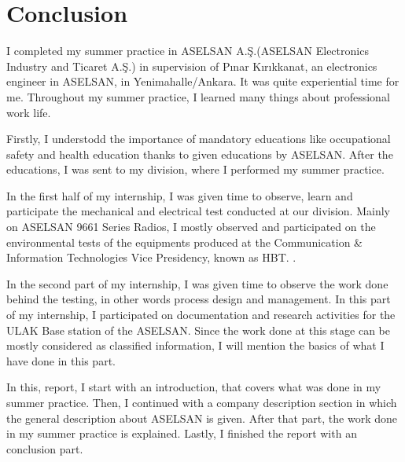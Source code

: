 	











\section{Conclusion}

\-
\indent I completed my summer practice in ASELSAN A.Ş.(ASELSAN Electronics Industry and Ticaret A.Ş.) in supervision of Pınar Kırıkkanat, an electronics engineer in ASELSAN, in Yenimahalle/Ankara. It was quite experiential time for me. Throughout my summer practice, I learned many things about professional work life. 

	Firstly, I understodd the importance of mandatory educations like occupational safety and health education thanks to given educations by ASELSAN. After the educations, I was  sent to my division, where I performed my summer practice.
	
	In the first half of my internship, I was given time to observe, learn and participate the mechanical and electrical test conducted at our division. Mainly on ASELSAN 9661 Series Radios, I mostly observed and participated on the environmental tests of the equipments produced at the Communication \& Information Technologies Vice Presidency, known as HBT. .
	
	In the second part of my internship, I was given time to observe the work done behind the testing, in other words process design and management. In this part of my internship, I participated on documentation and research activities for the ULAK Base station of the ASELSAN. Since the work done at this stage can be mostly considered as classified information, I will mention the basics of what I have done in this part.
	
	In this, report, I start with an introduction, that covers what was done in my summer practice. Then, I continued with a company description section in which the general description about ASELSAN is given. After that part, the work done in my summer practice is explained. Lastly, I finished the report with an conclusion part. 
		
